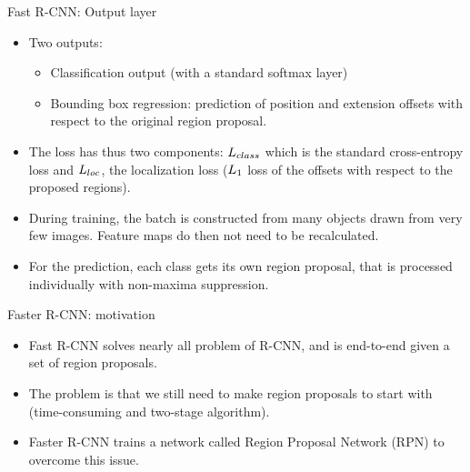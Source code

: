 \documentclass[xcolor=pdftex,dvipsnames,table]{beamer}
\begin{document}
\begin{frame}{Fast R-CNN: Output layer}
\begin{itemize}
\item Two outputs:
\begin{itemize}
	\item Classification output (with a standard softmax layer)
	\item Bounding box regression: prediction of position and extension offsets with respect to the original region proposal. 
\end{itemize}
\item The loss has thus two components: $L_{class}$ which is the standard cross-entropy loss and $L_{loc}$, the localization loss ($L_1$ loss of the offsets with respect to the proposed regions).
\item During training, the batch is constructed from many objects drawn from very few images. Feature maps do then not need to be recalculated. 
\item For the prediction, each class gets its own region proposal, that is processed individually with non-maxima suppression. 
\end{itemize}
\end{frame}


\begin{frame}{Faster R-CNN: motivation}
\begin{itemize}
	\item Fast R-CNN solves nearly all problem of R-CNN, and is end-to-end given a set of region proposals.
	\item The problem is that we still need to make region proposals to start with (time-consuming and two-stage algorithm).
	\item Faster R-CNN \cite{Ren2017} trains a network called Region Proposal Network (RPN) to overcome this issue.
\end{itemize}
\end{frame}
\end{document}
